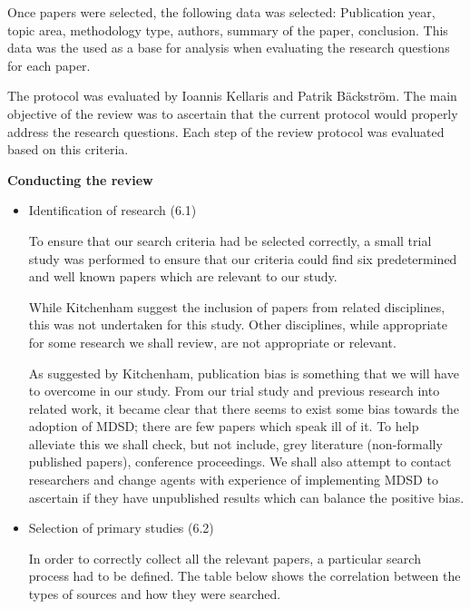 \documentclass[10pt,twocolumn]{article}
\begin{document}
Once papers were selected, the following data was selected: Publication year, topic area, methodology type, authors, summary of the paper, conclusion. This data was the used as a base for analysis when evaluating the research questions for each paper. 

The protocol was evaluated by Ioannis Kellaris and Patrik B\"ackstr\"om. The main objective of the review was to ascertain that the current protocol would properly address the research questions. Each step of the review protocol was evaluated based on this criteria. 

\textbf{Conducting the review}
\begin{itemize}
\item Identification of research (6.1)

To ensure that our search criteria had be selected correctly, a small trial study was performed to ensure that our criteria could find six predetermined and well known papers which are relevant to our study. %

While Kitchenham\cite{kitchenham2007guidelines} suggest the inclusion of papers from related disciplines, this was not undertaken for this study. Other disciplines, while appropriate for some research we shall review, are not appropriate or relevant. 

As suggested by Kitchenham\cite{kitchenham2007guidelines}, publication bias is something that we will have to overcome in our study. From our trial study and previous research into related work, it became clear that there seems to exist some bias towards the adoption of MDSD; there are few papers which speak ill of it. To help alleviate this we shall check, but not include, grey literature (non-formally published papers), conference proceedings. We shall also attempt to contact researchers and change agents with experience of implementing MDSD to ascertain if they have unpublished results which can balance the positive bias. 

\item Selection of primary studies (6.2)

In order to correctly collect all the relevant papers, a particular search process had to be defined. The table below shows the correlation between the types of sources and how they were searched.


\end{itemize}
\end{document}

